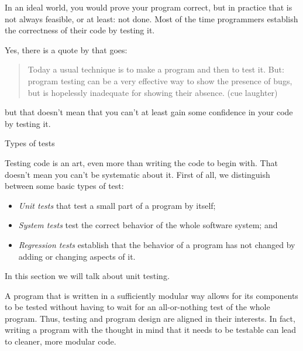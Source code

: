 

In an ideal world, you would prove your program correct,
but in practice that is not always feasible,
or at least: not done.
Most of the time programmers establish the correctness of their code
by testing it.

Yes, there is a quote by  that goes:
\begin{quotation}
  Today a usual technique is to make a program and then to test
  it. But: program testing can be a very effective way to show the
  presence of bugs, but is hopelessly inadequate for showing their
  absence. (cue laughter)
\end{quotation}
but that doesn't mean that you can't at least gain some confidence
in your code by testing it.

 {Types of tests}

Testing code is an art, even more than writing the code to begin with.
That doesn't mean you can't be systematic about it.
First of all, we distinguish between some basic types of test:
\begin{itemize}
\item \emph{Unit tests}
  that test a small part of a program by itself;
\item \emph{System tests}
  test the correct behavior of the whole software system; and
\item \emph{Regression tests}
  establish that the behavior of a program has not changed by adding or changing aspects of it.
\end{itemize}
In this section we will talk about unit testing.

A program that is written in a sufficiently  modular way
allows for its components to be tested
without having to wait for an all-or-nothing test of the whole program.
Thus, testing and program design are aligned in their interests.
In fact, writing a program with the thought in mind that it needs to be testable
can lead to cleaner, more modular code.

